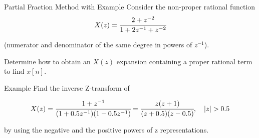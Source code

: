 \documentclass[aspectratio=169,xcolor=dvipsnames,svgnames,x11names,fleqn]{beamer}
\begin{document}
\begin{frame}{Partial Fraction Method with Example}
    Consider the non-proper rational function
    $$
    X(z) = \cfrac{2 + z^{-2}}{1 + 2z^{-1} + z^{-2}}
    $$

(numerator and denominator of the same degree in powers of $z^{-1}$). 

Determine how to obtain an $X(z)$ expansion containing a proper rational term to find $x[n]$.


\end{frame}

\begin{frame}{}
\vspace*{-9\baselineskip}
    \color{LightGray}{Blank space for calculation}
\end{frame}
\begin{frame}{}
\vspace*{-9\baselineskip}
    \color{LightGray}{Blank space for calculation}
\end{frame}
\begin{frame}{}
\vspace*{-9\baselineskip}
    \color{LightGray}{Blank space for calculation}
\end{frame}
\begin{frame}{}
\vspace*{-9\baselineskip}
    \color{LightGray}{Blank space for calculation}
\end{frame}

\begin{frame}{Example}
Find the inverse Z-transform of

$$
X(z) = \cfrac{1 + z^{-1}}{(1 + 0.5z^{-1})(1-0.5z^{-1}) } = \cfrac{z(z+1)}{(z + 0.5)(z-0.5)}, \quad |z|  > 0.5
$$

by using the negative and the positive powers of z representations.

\end{frame}

\begin{frame}{}
\vspace*{-9\baselineskip}
    \color{LightGray}{Blank space for calculation}
\end{frame}
\begin{frame}{}
\vspace*{-9\baselineskip}
    \color{LightGray}{Blank space for calculation}
\end{frame}
\begin{frame}{}
\vspace*{-9\baselineskip}
    \color{LightGray}{Blank space for calculation}
\end{frame}
\begin{frame}{}
\vspace*{-9\baselineskip}
    \color{LightGray}{Blank space for calculation}
\end{frame}
\end{document}
